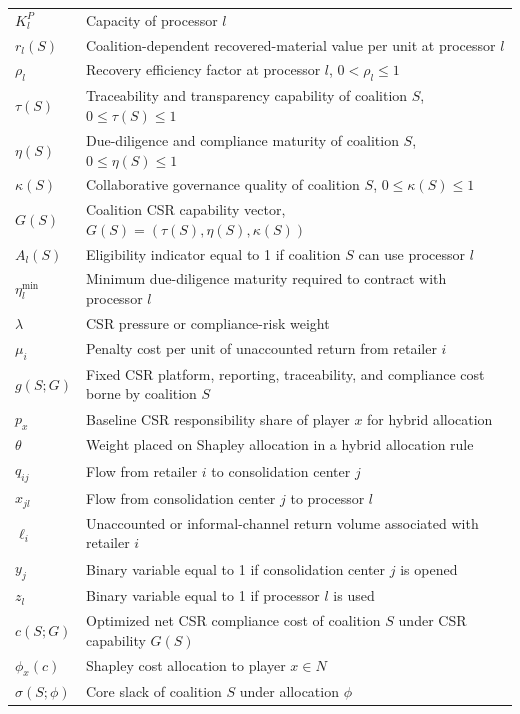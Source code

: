\begin{table}[htbp]
{\begin{tabular}{ll}
$K_l^P$ & Capacity of processor $l$ \\
$r_l(S)$ & Coalition-dependent recovered-material value per unit at processor $l$ \\
$\rho_l$ & Recovery efficiency factor at processor $l$, $0<\rho_l\leq 1$ \\
$\tau(S)$ & Traceability and transparency capability of coalition $S$, $0\leq \tau(S)\leq 1$ \\
$\eta(S)$ & Due-diligence and compliance maturity of coalition $S$, $0\leq \eta(S)\leq 1$ \\
$\kappa(S)$ & Collaborative governance quality of coalition $S$, $0\leq \kappa(S)\leq 1$ \\
$G(S)$ & Coalition CSR capability vector, $G(S)=(\tau(S),\eta(S),\kappa(S))$ \\
$A_l(S)$ & Eligibility indicator equal to 1 if coalition $S$ can use processor $l$ \\
$\eta_l^{\min}$ & Minimum due-diligence maturity required to contract with processor $l$ \\
$\lambda$ & CSR pressure or compliance-risk weight \\
$\mu_i$ & Penalty cost per unit of unaccounted return from retailer $i$ \\
$g(S;G)$ & Fixed CSR platform, reporting, traceability, and compliance cost borne by coalition $S$ \\
$p_x$ & Baseline CSR responsibility share of player $x$ for hybrid allocation \\
$\theta$ & Weight placed on Shapley allocation in a hybrid allocation rule \\
\midrule
$q_{ij}$ & Flow from retailer $i$ to consolidation center $j$ \\
$x_{jl}$ & Flow from consolidation center $j$ to processor $l$ \\
$\ell_i$ & Unaccounted or informal-channel return volume associated with retailer $i$ \\
$y_j$ & Binary variable equal to 1 if consolidation center $j$ is opened \\
$z_l$ & Binary variable equal to 1 if processor $l$ is used \\
$c(S;G)$ & Optimized net CSR compliance cost of coalition $S$ under CSR capability $G(S)$ \\
$\phi_x(c)$ & Shapley cost allocation to player $x\in N$ \\
$\sigma(S;\phi)$ & Core slack of coalition $S$ under allocation $\phi$ \\
\bottomrule
\end{tabular}%
}
\end{table}

